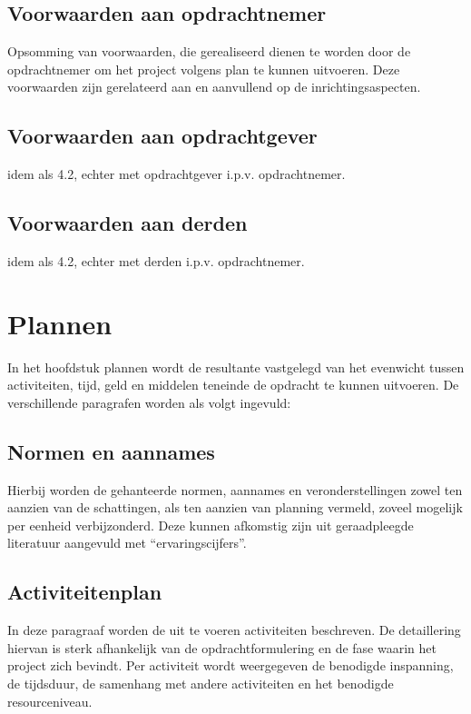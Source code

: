 \documentclass{article}
\begin{document}
\subsection{Voorwaarden aan opdrachtnemer}
Opsomming van voorwaarden, die gerealiseerd dienen te worden door de opdrachtnemer om het project volgens plan te kunnen uitvoeren.
Deze voorwaarden zijn gerelateerd aan en aanvullend op de inrichtingsaspecten.

\subsection{Voorwaarden aan opdrachtgever}

idem als 4.2, echter met opdrachtgever i.p.v. opdrachtnemer.

\subsection{Voorwaarden aan derden}

idem als 4.2, echter met derden i.p.v. opdrachtnemer.


\section{Plannen}
In het hoofdstuk plannen wordt de resultante vastgelegd van het evenwicht tussen activiteiten, tijd,
geld en middelen teneinde de opdracht te kunnen uitvoeren.
De verschillende paragrafen worden als volgt ingevuld:

\subsection{Normen en aannames}
Hierbij worden de gehanteerde normen, aannames en veronderstellingen zowel ten aanzien van de schattingen,
als ten aanzien van planning vermeld, zoveel mogelijk per eenheid verbijzonderd.
Deze kunnen afkomstig zijn uit geraadpleegde literatuur aangevuld met ``ervaringscijfers''.

\subsection{Activiteitenplan}
In deze paragraaf worden de uit te voeren activiteiten beschreven.
De detaillering hiervan is sterk afhankelijk van de opdrachtformulering en de fase waarin het project zich bevindt.
Per activiteit wordt weergegeven de benodigde inspanning, de tijdsduur,
de samenhang met andere activiteiten en het benodigde resourceniveau.
\end{document}
